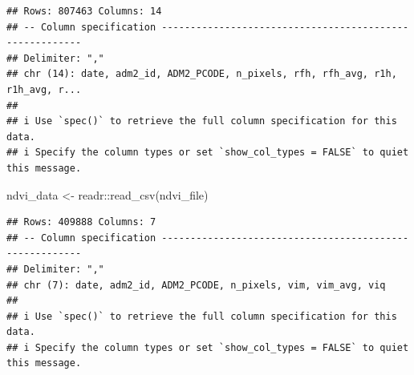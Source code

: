 \documentclass[
]{article}
\newenvironment{Shaded}{}{}
\newcommand{\FunctionTok}[1]{\textcolor[rgb]{0.02,0.16,0.49}{#1}}
\newcommand{\NormalTok}[1]{#1}
\newcommand{\OtherTok}[1]{\textcolor[rgb]{0.00,0.44,0.13}{#1}}
\newcommand{\SpecialCharTok}[1]{\textcolor[rgb]{0.25,0.44,0.63}{#1}}
\begin{document}
\begin{verbatim}
## Rows: 807463 Columns: 14
## -- Column specification --------------------------------------------------------
## Delimiter: ","
## chr (14): date, adm2_id, ADM2_PCODE, n_pixels, rfh, rfh_avg, r1h, r1h_avg, r...
## 
## i Use `spec()` to retrieve the full column specification for this data.
## i Specify the column types or set `show_col_types = FALSE` to quiet this message.
\end{verbatim}

\begin{Shaded}
\begin{Highlighting}[]
\NormalTok{ndvi\_data }\OtherTok{\textless{}{-}}\NormalTok{ readr}\SpecialCharTok{::}\FunctionTok{read\_csv}\NormalTok{(ndvi\_file)}
\end{Highlighting}
\end{Shaded}

\begin{verbatim}
## Rows: 409888 Columns: 7
## -- Column specification --------------------------------------------------------
## Delimiter: ","
## chr (7): date, adm2_id, ADM2_PCODE, n_pixels, vim, vim_avg, viq
## 
## i Use `spec()` to retrieve the full column specification for this data.
## i Specify the column types or set `show_col_types = FALSE` to quiet this message.
\end{verbatim}
\end{document}
